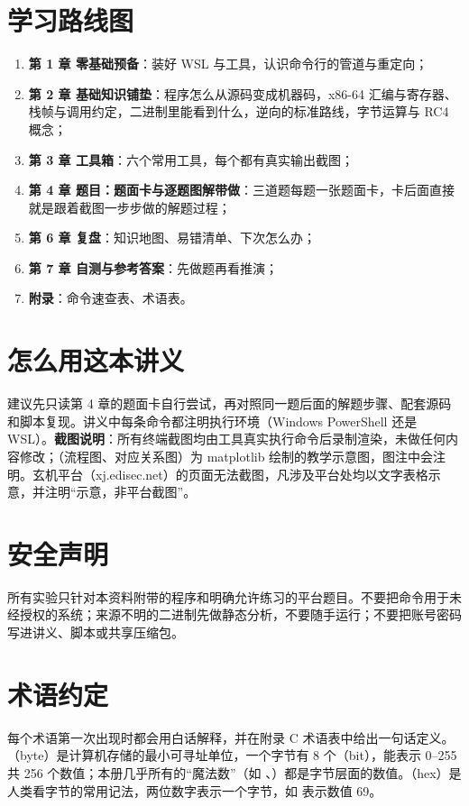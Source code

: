\documentclass[UTF8,12pt,oneside]{ctexbook}
\begin{document}
\section*{学习路线图}
\begin{enumerate}
\item \textbf{第 1 章 零基础预备}：装好 WSL 与工具，认识命令行的管道与重定向；
\item \textbf{第 2 章 基础知识铺垫}：程序怎么从源码变成机器码，x86-64 汇编与寄存器、栈帧与调用约定，二进制里能看到什么，逆向的标准路线，字节运算与 RC4 概念；
\item \textbf{第 3 章 工具箱}：六个常用工具，每个都有真实输出截图；
\item \textbf{第 4 章 题目：题面卡与逐题图解带做}：三道题每题一张题面卡，卡后面直接就是跟着截图一步步做的解题过程；
\item \textbf{第 6 章 复盘}：知识地图、易错清单、下次怎么办；
\item \textbf{第 7 章 自测与参考答案}：先做题再看推演；
\item \textbf{附录}：命令速查表、术语表。
\end{enumerate}

\section*{怎么用这本讲义}
建议先只读第 4 章的题面卡自行尝试，再对照同一题后面的解题步骤、配套源码和脚本复现。讲义中每条命令都注明执行环境（Windows PowerShell 还是 WSL）。\textbf{截图说明}：所有终端截图均由工具真实执行命令后录制渲染，未做任何内容修改；（流程图、对应关系图）为 matplotlib 绘制的教学示意图，图注中会注明。玄机平台（xj.edisec.net）的页面无法截图，凡涉及平台处均以文字表格示意，并注明“示意，非平台截图”。

\section*{安全声明}
所有实验只针对本资料附带的程序和明确允许练习的平台题目。不要把命令用于未经授权的系统；来源不明的二进制先做静态分析，不要随手运行；不要把账号密码写进讲义、脚本或共享压缩包。

\section*{术语约定}
每个术语第一次出现时都会用白话解释，并在附录 C 术语表中给出一句话定义。（byte）是计算机存储的最小可寻址单位，一个字节有 8 个（bit），能表示 0--255 共 256 个数值；本册几乎所有的“魔法数”（如 、）都是字节层面的数值。（hex）是人类看字节的常用记法，两位数字表示一个字节，如  表示数值 69。
\end{document}
